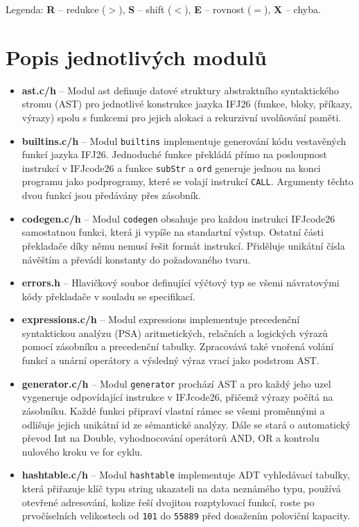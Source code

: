 \documentclass[]{ifjclass}
\begin{document}
    \noindent
    Legenda: \textbf{R} -- redukce ($>$), \textbf{S} -- shift ($<$),
    \textbf{E} -- rovnost ($=$), \textbf{X} -- chyba.
    
    
    \newpage
    \section{Popis jednotlivých modulů}
        \begin{itemize}
        \item \textbf{ast.c/h} -- Modul ast definuje datové struktury abstraktního syntaktického stromu (AST) pro jednotlivé konstrukce jazyka IFJ26 (funkce, bloky, příkazy, výrazy) spolu s funkcemi pro jejich alokaci a rekurzivní uvolňování paměti.
        \item \textbf{builtins.c/h} -- Modul \texttt{builtins} implementuje generování kódu vestavěných funkcí jazyka IFJ26. Jednoduché funkce překládá přímo na posloupnost instrukcí v IFJcode26 a funkce \texttt{subStr} a \texttt{ord} generuje jednou na konci programu jako podprogramy, které se volají instrukcí \texttt{CALL}. Argumenty těchto dvou funkcí jsou předávány přes zásobník.
        \item \textbf{codegen.c/h} -- Modul \texttt{codegen} obsahuje pro každou instrukci IFJcode26 samostatnou funkci, která ji vypíše na standartní výstup. Ostatní části překladače díky němu nemusí řešit formát instrukcí. Přiděluje unikátní čísla návěštím a převádí konstanty do požadovaného tvaru.
        \item \textbf{errors.h} -- Hlavičkový soubor definující výčtový typ se všemi návratovými kódy překladače v souladu se specifikací.
        \item \textbf{expressions.c/h} -- Modul expressions implementuje precedenční syntaktickou analýzu (PSA) aritmetických, relačních a logických výrazů pomocí zásobníku a precedenční tabulky. Zpracovává také vnořená volání funkcí a unární operátory a výsledný výraz vrací jako podstrom AST.
        \item \textbf{generator.c/h} -- Modul \texttt{generator} prochází AST a pro každý jeho uzel vygeneruje odpovídající instrukce v IFJcode26, přičemž výrazy počítá na zásobníku. Každé funkci připraví vlastní rámec se všemi proměnnými a odlišuje jejich unikátní id ze sémantické analýzy. Dále se stará o automatický převod Int na Double, vyhodnocování operátorů AND, OR a kontrolu nulového kroku ve for cyklu.
        \item \textbf{hashtable.c/h} -- Modul \texttt{hashtable} implementuje ADT vyhledávací tabulky, která přiřazuje klíč typu string ukazateli na data neznámého typu, používá otevřené adresování, kolize řeší dvojitou rozptylovací funkcí, roste po prvočíselních velikostech od \texttt{101} do \texttt{55889} před dosažením poloviční kapacity.
        

\end{itemize}
\end{document}
